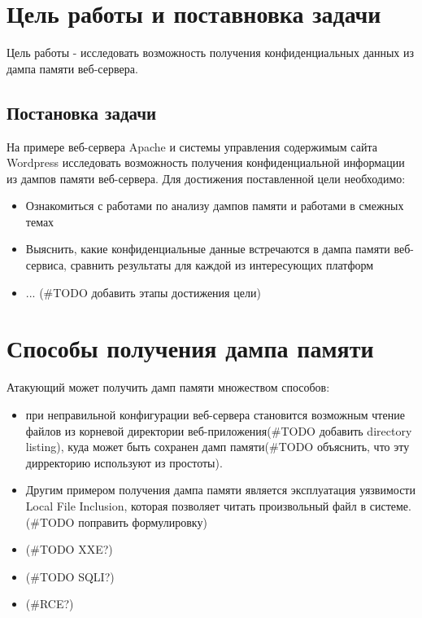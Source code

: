 \documentclass[20pt]{article}
\begin{document}
\newpage

\section{Цель работы и поставновка задачи}
Цель работы - исследовать возможность получения конфиденциальных данных из
дампа памяти веб-сервера.

\subsection{Постановка задачи}
На примере веб-сервера Apache и системы управления содержимым сайта Wordpress
исследовать возможность получения конфиденциальной информации из дампов памяти
веб-сервера. Для достижения поставленной цели необходимо:

\begin{itemize}
  \item Ознакомиться с работами по анализу дампов памяти и работами в смежных темах
  \item Выяснить, какие конфиденциальные данные встречаются в дампа памяти веб-сервиса,
сравнить результаты для каждой из интересующих платформ
  \item ...
  (#TODO добавить этапы достижения цели)
\end{itemize}

\newpage

\section{Способы получения дампа памяти}

Атакующий может получить дамп памяти множеством способов:
\begin{itemize}
  \item при неправильной конфигурации веб-сервера становится возможным чтение
  файлов из корневой директории веб-приложения(#TODO добавить directory listing),
  куда может быть сохранен дамп памяти(#TODO объяснить, что эту дирректорию
  используют из простоты).
  \item Другим примером получения дампа памяти является эксплуатация уязвимости
  Local File Inclusion\cite{lfi}, которая позволяет читать произвольный файл в
  системе. (#TODO поправить формулировку)
  \item (#TODO XXE?)
  \item (#TODO SQLI?)
  \item (#RCE?)
\end{itemize}
\end{document}
